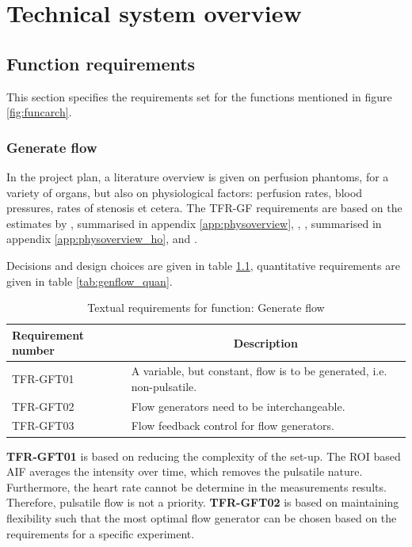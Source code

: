 \chapter{Technical system overview}

\section{Function requirements}
This section specifies the requirements set for the functions mentioned in figure \ref{fig:funcarch}.
\subsection{Generate flow}
In the project plan, a literature overview is given on perfusion phantoms, for a variety of organs, but also on physiological factors: perfusion rates, blood pressures, rates of stenosis et cetera. The TFR-GF requirements are based on the estimates by \cite{uren1994relation}, summarised in appendix \ref{app:physoverview}, \cite{chiribiri2013normal}, \cite{ho2014dynamic}, summarised in appendix \ref{app:physoverview_ho}, and \cite{slart2015pres}.

Decisions and design choices are given in table \ref{tab:genflow_text}, quantitative requirements are given in table \ref{tab:genflow_quan}.

\begin{table}[H]
\caption{Textual requirements for function: Generate flow}
\label{tab:genflow_text}
\begin{tabular}{p{25mm}|p{115mm}|}
	\textbf{Requirement number} & \multicolumn{1}{c}{\textbf{Description}} \\
	\hline
	TFR-GFT01 & A variable, but constant, flow is to be generated, i.e. non-pulsatile. \\
	TFR-GFT02 & Flow generators need to be interchangeable. \\
	TFR-GFT03 & Flow feedback control for flow generators. \\
	\cline{2-2}
\end{tabular}
\end{table}

\textbf{TFR-GFT01} is based on reducing the complexity of the set-up. The ROI based AIF averages the intensity over time, which removes the pulsatile nature. Furthermore, the heart rate cannot be determine in the measurements results. Therefore, pulsatile flow is not a priority.
\textbf{TFR-GFT02} is based on maintaining flexibility such that the most optimal flow generator can be chosen based on the requirements for a specific experiment.

